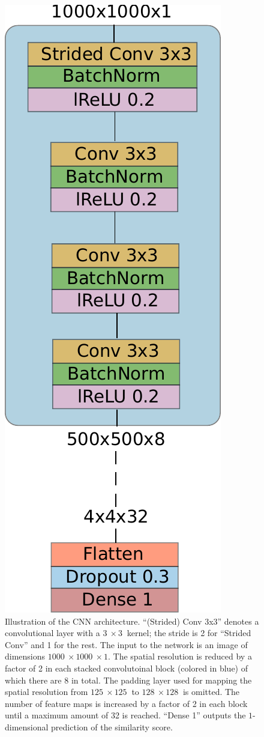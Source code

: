 \documentclass[10pt,conference,compsocconf]{IEEEtran}
\begin{document}
\begin{figure}
    \centering
    \includegraphics[width=0.35\columnwidth]{assets/nn_classifier_arch.pdf}
    \caption{Illustration of the CNN architecture. ``(Strided) Conv 3x3'' denotes a convolutional layer with a $\SI{3}{}\times\SI{3}{}$ kernel; the stride is \SI{2}{} for ``Strided Conv'' and \SI{1}{} for the rest.
    The input to the network is an image of dimensions $\SI{1000}{}\times\SI{1000}{}\times1$. The spatial resolution is reduced by a factor of \SI{2}{} in each stacked convolutoinal block (colored in blue) of which there are 8 in total. The padding layer used for mapping the spatial resolution from $\SI{125}{}\times\SI{125}{}$ to $\SI{128}{}\times\SI{128}{}$ is omitted. The number of feature maps is increased by a factor of \SI{2}{} in each block until a maximum amount of \SI{32}{} is reached. ``Dense 1'' outputs the $1$-dimensional prediction of the similarity score.} %
    \label{fig:nn_classifier_arch}
\end{figure}

\end{document}
